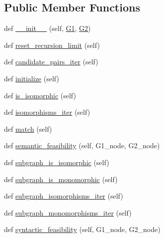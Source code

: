 \subsection*{Public Member Functions}
\begin{DoxyCompactItemize}
\item 
def \hyperlink{classnetworkx_1_1algorithms_1_1isomorphism_1_1isomorphvf2_1_1GraphMatcher_ae2e418c559a20cb013c0068f8ce232c7}{\+\_\+\+\_\+init\+\_\+\+\_\+} (self, \hyperlink{classnetworkx_1_1algorithms_1_1isomorphism_1_1isomorphvf2_1_1GraphMatcher_a7a5a2c6d9d4bc47ea16dd8392c2c2e17}{G1}, \hyperlink{classnetworkx_1_1algorithms_1_1isomorphism_1_1isomorphvf2_1_1GraphMatcher_a0513325f608a0a7357d0b43111e233ec}{G2})
\item 
def \hyperlink{classnetworkx_1_1algorithms_1_1isomorphism_1_1isomorphvf2_1_1GraphMatcher_a399bd1eed1f430b2bbb05cd47a1f7d03}{reset\+\_\+recursion\+\_\+limit} (self)
\item 
def \hyperlink{classnetworkx_1_1algorithms_1_1isomorphism_1_1isomorphvf2_1_1GraphMatcher_a60ac87374ab7b59d8e821e52a182d5fb}{candidate\+\_\+pairs\+\_\+iter} (self)
\item 
def \hyperlink{classnetworkx_1_1algorithms_1_1isomorphism_1_1isomorphvf2_1_1GraphMatcher_a9c57d3f90f57453bd279ef22d2dddb34}{initialize} (self)
\item 
def \hyperlink{classnetworkx_1_1algorithms_1_1isomorphism_1_1isomorphvf2_1_1GraphMatcher_a06f274caffad9c96e5324104fed1432c}{is\+\_\+isomorphic} (self)
\item 
def \hyperlink{classnetworkx_1_1algorithms_1_1isomorphism_1_1isomorphvf2_1_1GraphMatcher_aa1fd70c79a88bcc7f1235348be0ae0ed}{isomorphisms\+\_\+iter} (self)
\item 
def \hyperlink{classnetworkx_1_1algorithms_1_1isomorphism_1_1isomorphvf2_1_1GraphMatcher_a7ef6e953c4d903586b2425f2c6d04f3c}{match} (self)
\item 
def \hyperlink{classnetworkx_1_1algorithms_1_1isomorphism_1_1isomorphvf2_1_1GraphMatcher_a50dd22ec90b9c13b0731ce1ba58b4379}{semantic\+\_\+feasibility} (self, G1\+\_\+node, G2\+\_\+node)
\item 
def \hyperlink{classnetworkx_1_1algorithms_1_1isomorphism_1_1isomorphvf2_1_1GraphMatcher_a8d4981050a5a6e30087630ed4fd50961}{subgraph\+\_\+is\+\_\+isomorphic} (self)
\item 
def \hyperlink{classnetworkx_1_1algorithms_1_1isomorphism_1_1isomorphvf2_1_1GraphMatcher_a5243545e9e1dfb31934357c56640d54d}{subgraph\+\_\+is\+\_\+monomorphic} (self)
\item 
def \hyperlink{classnetworkx_1_1algorithms_1_1isomorphism_1_1isomorphvf2_1_1GraphMatcher_aeaf5b76870b8c6050a0d8d0681e7bb15}{subgraph\+\_\+isomorphisms\+\_\+iter} (self)
\item 
def \hyperlink{classnetworkx_1_1algorithms_1_1isomorphism_1_1isomorphvf2_1_1GraphMatcher_af08b55814e4bdc722233d3e854f72e18}{subgraph\+\_\+monomorphisms\+\_\+iter} (self)
\item 
def \hyperlink{classnetworkx_1_1algorithms_1_1isomorphism_1_1isomorphvf2_1_1GraphMatcher_afc59e949709411ccc8761114574fe57e}{syntactic\+\_\+feasibility} (self, G1\+\_\+node, G2\+\_\+node)
\end{DoxyCompactItemize}
